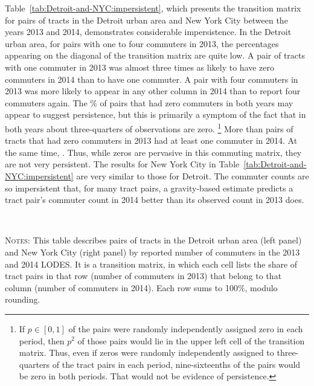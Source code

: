 \documentclass[11pt]{article}
\theoremstyle{definition}
\begin{document}
Table~\ref{tab:Detroit-and-NYC:impersistent}, which presents the transition matrix for pairs of tracts in the Detroit urban area and New York City between the years 2013 and 2014, demonstrates considerable impersistence.
In the Detroit urban area, for pairs with one to four commuters in 2013,
the percentages appearing on the diagonal of the transition matrix are quite low.
A pair of tracts with one commuter in 2013 was almost three times as likely to have zero commuters in 2014 than to have one commuter.
A pair with four commuters in 2013 was more likely to appear in any other column in 2014 than to report four commuters again.
The \% 
of pairs that had zero commuters in both years may appear to suggest persistence,
but this is primarily a symptom of the fact that in both years about three-quarters of observations are zero.%
\footnote{%
If $p \in [0,1]$ of the pairs were randomly independently assigned zero in each period,
	then $p^2$ of those pairs would lie in the upper left cell of the transition matrix.
	Thus, even if zeros were randomly independently assigned to three-quarters of the tract pairs in each period,
	nine-sixteenths of the pairs would be zero in both periods.
	That would not be evidence of persistence.
}
More than  pairs of tracts that had zero commuters in 2013 had at least one commuter in 2014.
At the same time, 
.
Thus, while zeros are pervasive in this commuting matrix, they are not very persistent.
The results for New York City in Table~\ref{tab:Detroit-and-NYC:impersistent} are very similar to those for Detroit.
The commuter counts are so impersistent that, for many tract pairs, a gravity-based estimate predicts a tract pair's commuter count in 2014 better than its observed count in 2013 does.

\begin{table}[!hbt]
\caption{The impersistence of commuting counts for tract pairs in Detroit and NYC}
\label{tab:Detroit-and-NYC:impersistent}
\subfloat[Detroit]{\resizebox{0.47\textwidth}{!}{}}
\qquad
\subfloat[NYC]{\resizebox{0.47\textwidth}{!}{}}\\
\begin{minipage}{1\textwidth}
{\footnotesize \textsc{Notes}: 
This table describes pairs of tracts in the Detroit urban area (left panel) and New York City (right panel)
by reported number of commuters in the 2013 and 2014 LODES.
It is a transition matrix, in which each cell lists the share of tract pairs in that row (number of commuters in 2013) that belong to that column (number of commuters in 2014).
Each row sums to 100\%, modulo rounding.
\par}
\end{minipage}
\end{table}
\end{document}
